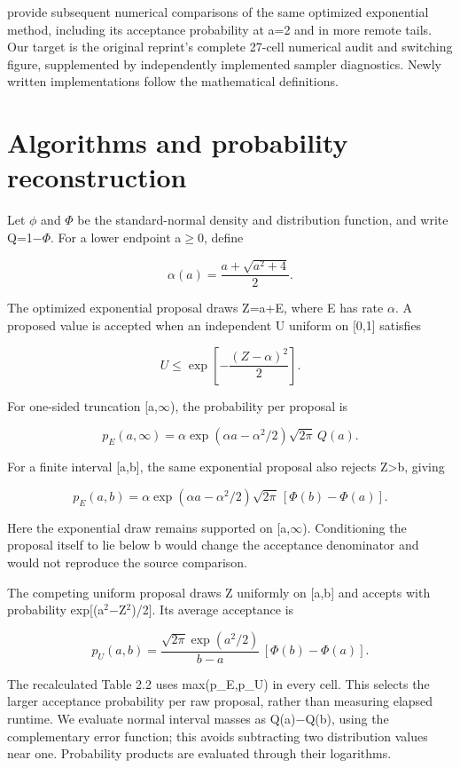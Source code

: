\citet{botev2016} provide subsequent numerical comparisons of the same optimized exponential method, including its acceptance probability at a=2 and in more remote tails. Our target is the original reprint’s complete 27-cell numerical audit and switching figure, supplemented by independently implemented sampler diagnostics. Newly written implementations follow the mathematical definitions.

\section{Algorithms and probability reconstruction}

Let $\phi$ and $\Phi$ be the standard-normal density and distribution function, and write Q=1$-$$\Phi$. For a lower endpoint a$\geq$0, define

\[
\alpha(a)=\frac{a+\sqrt{a^2+4}}2.
\]

The optimized exponential proposal draws Z=a+E, where E has rate $\alpha$. A proposed value is accepted when an independent U uniform on [0,1] satisfies

\[
U\leq \exp\left[-\frac{(Z-\alpha)^2}{2}\right].
\]

For one-sided truncation [a,$\infty$), the probability per proposal is

\[
p_E(a,\infty)=\alpha\exp(\alpha a-\alpha^2/2)\sqrt{2\pi}\,Q(a).
\]

For a finite interval [a,b], the same exponential proposal also rejects Z>b, giving

\[
p_E(a,b)=\alpha\exp(\alpha a-\alpha^2/2)\sqrt{2\pi}\,[\Phi(b)-\Phi(a)].
\]

Here the exponential draw remains supported on [a,$\infty$). Conditioning the proposal itself to lie below b would change the acceptance denominator and would not reproduce the source comparison.

The competing uniform proposal draws Z uniformly on [a,b] and accepts with probability exp[(a$^2$$-$Z$^2$)/2]. Its average acceptance is

\[
p_U(a,b)=\frac{\sqrt{2\pi}\exp(a^2/2)}{b-a}\,[\Phi(b)-\Phi(a)].
\]

The recalculated Table 2.2 uses max(p\_E,p\_U) in every cell. This selects the larger acceptance probability per raw proposal, rather than measuring elapsed runtime. We evaluate normal interval masses as Q(a)$-$Q(b), using the complementary error function; this avoids subtracting two distribution values near one. Probability products are evaluated through their logarithms.

